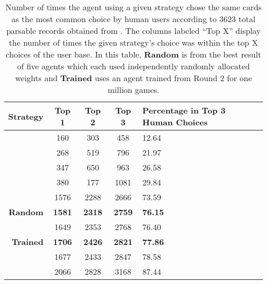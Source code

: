 
\begin{table}

	\begin{tabular}{|r|c|c|c|p{4cm}|}
		\hline
		\textbf{Strategy} & \textbf{Top 1} & \textbf{Top 2} & \textbf{Top 3}
			& \textbf{Percentage in Top 3 Human Choices} \\
		\hline
		\peggingminavggiven & 160 & 303 & 458 & 12.64 \\\hline
		\peggingmaxmedgained & 268 & 519 & 796 & 21.97 \\\hline
		\peggingmaxavggained & 347 & 650 & 963 & 26.58 \\\hline
		\cribminavg & 380 & 177 & 1081 & 29.84 \\\hline
		\handmaxmin & 1576 & 2288 & 2666 & 73.59 \\\hline
		\textbf{Random} & \textbf{1581} & \textbf{2318} & \textbf{2759} &
			\textbf{76.15} \\\hline
		\handmaxmed & 1649 & 2353 & 2768 & 76.40 \\\hline
		\textbf{Trained} & \textbf{1706} & \textbf{2426} & \textbf{2821} &
			\textbf{77.86} \\\hline
		\handmaxposs & 1677 & 2433 & 2847 & 78.58 \\\hline
		\handmaxavg & 2066 & 2828 & 3168 & 87.44 \\\hline
	\end{tabular}
	\caption{
		Number of times the agent using a given strategy chose the same cards as
		the most common choice by human users
		according to 3623 total parsable records obtained from
		\cite{dailycribbagehand}.
		The columns labeled ``Top X'' display the number of times the given
		strategy's choice was within the top X choices of the user base.
		In this table,
		\textbf{Random} is from the best result of five agents which each used
		independently randomly allocated weights
		and
		\textbf{Trained} uses an agent trained from Round 2 for one million
		games.
	}
	\label{tab:expts-starts-human}
\end{table}
